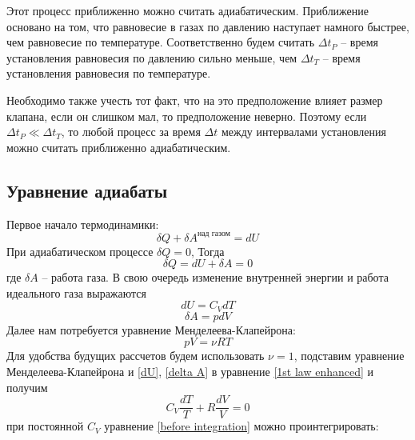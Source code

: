 \documentclass[a4paper,12pt]{report}
\begin{document}
        Этот процесс приближенно можно считать адиабатическим. Приближение основано на том, что равновесие в газах по давлению наступает намного быстрее, чем равновесие по температуре. Соответственно будем считать $\Delta t_P$ -- время установления равновесия по давлению сильно меньше, чем $\Delta t_T$ -- время установления равновесия по температуре.

        Необходимо также учесть тот факт, что на это предположение влияет размер клапана, если он слишком мал, то предположение неверно. Поэтому если $\Delta t_P \ll \Delta t_T$, то любой процесс за время $\Delta t$ между интервалами установления можно считать приближенно адиабатическим.

    \subsection*{Уравнение адиабаты}
        Первое начало термодинамики:
        \begin{equation}
            \label{1st law thermodynamics}
            \delta Q + \delta A^{\text{над газом}}=dU
        \end{equation}
        При адиабатическом процессе $\delta Q = 0$, Тогда 
        \begin{equation}
            \label{1st law enhanced}
            \delta Q = dU+\delta A = 0
        \end{equation}
        где $\delta A$ -- работа газа. В свою очередь изменение внутренней энергии и работа идеального газа выражаются
        \begin{equation}
            dU=C_VdT
            \label{dU}
        \end{equation}
        \begin{equation}
            \delta A=pdV
            \label{delta A}
        \end{equation}
        Далее нам потребуется уравнение Менделеева-Клапейрона:
        \begin{equation}
            pV=\nu RT
            \label{pV}
        \end{equation}
        Для удобства будущих рассчетов будем использовать $\nu = 1$, подставим уравнение Менделеева-Клапейрона и \eqref{dU}, \eqref{delta A} в уравнение \eqref{1st law enhanced} и получим
        \begin{equation}
            C_V\frac{dT}{T}+R\frac{dV}{V}=0
            \label{before integration}
        \end{equation}
        при постоянной $C_V$ уравнение \eqref{before integration} можно проинтегрировать:
\end{document}
